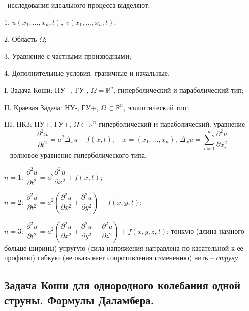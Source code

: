 \documentclass[9pt]{article}
\begin{document}
\ 
 исследования идеального процесса выделяют:
\par1. \(u(x_1,...,x_n,t),\ v(x_1,...,x_n,t)\);
\par2. Область \(\Omega\);
\par3. Уравнение с частными производными;
\par4. Дополнительные условия: граничные и начальные.
\par I. Задача Коши: НУ+, ГУ-, \(\Omega =\mathbb R^n\), гиперболический и параболический тип;
\par II. Краевая Задача: НУ-, ГУ+, \(\Omega\subset\mathbb R^n\), эллиптический тип;
\par III. НКЗ: НУ+, ГУ+, \(\Omega \subset \mathbb R^n\) гиперболический и параболический.
\parОбщее уравнение
\begin{equation}
    \dfrac{\partial^2u}{\partial t^2}=a^2\Delta_xu+f(x,t),\quad x=(x_1,...,x_n),\ \Delta_xu=\sum_{i=1}^n\dfrac{\partial^2u}{\partial x_i^2}
\end{equation}
-- волновое уравнение гиперболического типа.
\par\(n=1:\ \dfrac{\partial^2u}{\partial t^2}=a^2\dfrac{\partial^2u}{\partial x^2}+f(x,t)\);
\par\(n=2:\ \dfrac{\partial^2u}{\partial t^2}=a^2\left(\dfrac{\partial^2u}{\partial x^2}+\dfrac{\partial^2u}{\partial y^2}\right)+f(x,y,t)\);
\par\(n=3:\ \dfrac{\partial^2u}{\partial t^2}=a^2\left(\dfrac{\partial^2u}{\partial x^2}+\dfrac{\partial^2u}{\partial y^2}+\dfrac{\partial^2u}{\partial z^2}\right)+f(x,y,z,t)\);
\parРассмотрим тонкую (длина намного больше ширины) упругую (сила напряжения направлена по касательной к ее профилю) гибкую (не оказывает сопротивления изменению) нить -- \textit{струну}.

\subsection{Задача Коши для однородного колебания одной струны. Формулы Даламбера.}
\end{document}
